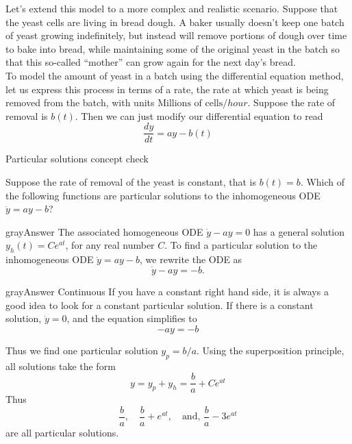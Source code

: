 Let's extend this model to a more complex and realistic scenario.
Suppose that the yeast cells are living in bread dough.
A baker usually doesn't keep one batch of yeast growing indefinitely,
but instead will remove portions of dough over time to bake into bread,
while maintaining some of the original yeast in the batch so
that this so-called ``mother'' can grow again for the next day's bread.\\

To model the amount of yeast in a batch using the differential equation method,
let us express this process in terms of a rate, the rate at which yeast is being removed from the batch,
with units \textbf{$\text{Millions of cells}/hour$}.
Suppose the rate of removal is $b(t)$.
Then we can just modify our differential equation to read
\begin{equation*}
  \frac{dy}{dt} = ay -b(t)
\end{equation*}

\begin{exercise}
  Particular solutions concept check
\end{exercise}
Suppose the rate of removal of the yeast is constant,
that is $b(t) = b$.
Which of the following functions are particular solutions to the inhomogeneous ODE
$\dot{y} = ay − b$?

\begin{mybox}{gray}{Answer}
  The associated homogeneous ODE $\dot{y}-ay=0$ has a general solution $y_ h\left(t\right)=Ce^{at}$,
  for any real number $C$.
  To find a particular solution to the inhomogeneous ODE $\dot{y}=ay−b$, we rewrite the ODE as
  \begin{equation*}
    \dot{y} - ay = -b. 
  \end{equation*}

\end{mybox}

\begin{mybox}{gray}{Answer Continuous}
    If you have a constant right hand side, it is always a good idea to look for a constant particular solution.
  If there is a constant solution, $\dot{y} = 0$, and the equation simplifies to
  \begin{equation*}
    -ay = -b 
  \end{equation*}

  Thus we find one particular solution $y_p= b/a$.
  Using the superposition principle, all solutions take the form
  \begin{equation*}
    y = y_p + y_h = \frac{b}{a} + Ce^{at}
  \end{equation*}
  Thus
  \begin{equation*}
    \frac{b}{a}, \quad \frac{b}{a} + e^{at}, \quad \text{and, } \frac{b}{a} -3 e^{at}  
  \end{equation*}
  are all particular solutions.
\end{mybox}
\clearpage
